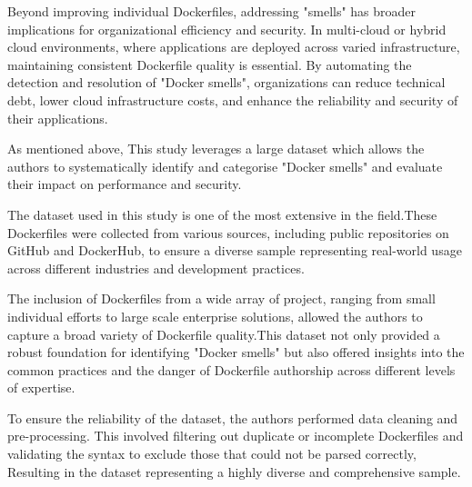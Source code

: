 Beyond improving individual Dockerfiles, addressing "smells" has broader implications for organizational efficiency and security. In multi-cloud or hybrid cloud environments, where applications are deployed across varied infrastructure, maintaining consistent Dockerfile quality is essential. By automating the detection and resolution of "Docker smells", organizations can reduce technical debt, lower cloud infrastructure costs, and enhance the reliability and security of their applications.\cite{CI/CD2020}

As mentioned above, This study leverages a large dataset which allows the authors to systematically identify and categorise "Docker smells" and evaluate their impact on performance and security.

The dataset used in this study is one of the most extensive in the field.These Dockerfiles were collected from various sources, including public repositories on GitHub and DockerHub, to ensure a diverse sample representing real-world usage across different industries and development practices. \cite{DockerArtifacts}

The inclusion of Dockerfiles from a wide array of project, ranging from small individual efforts to large scale enterprise solutions, allowed the authors to capture a broad variety of Dockerfile quality.This dataset not only provided a robust foundation for identifying "Docker smells" but also offered insights into the common practices and the danger of Dockerfile authorship across different levels of expertise. 

To ensure the reliability of the dataset, the authors performed data cleaning and pre-processing. This involved filtering out duplicate or incomplete Dockerfiles and validating the syntax to exclude those that could not be parsed correctly, Resulting in the dataset representing a highly diverse and comprehensive sample. \cite{DockerArtifacts}

